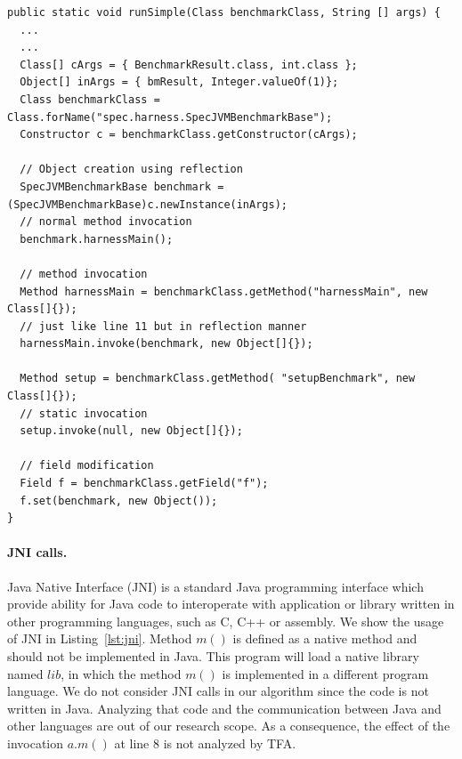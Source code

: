 \documentclass{fac}
\begin{document}
\begin{minipage}{\linewidth}
\begin{lstlisting}[caption={Example code of reflection},label={lst:reflection}]
public static void runSimple(Class benchmarkClass, String [] args) {
  ...
  ...
  Class[] cArgs = { BenchmarkResult.class, int.class };
  Object[] inArgs = { bmResult, Integer.valueOf(1)};
  Class benchmarkClass = Class.forName("spec.harness.SpecJVMBenchmarkBase");
  Constructor c = benchmarkClass.getConstructor(cArgs);

  // Object creation using reflection
  SpecJVMBenchmarkBase benchmark = (SpecJVMBenchmarkBase)c.newInstance(inArgs);
  // normal method invocation
  benchmark.harnessMain();

  // method invocation
  Method harnessMain = benchmarkClass.getMethod("harnessMain", new Class[]{});
  // just like line 11 but in reflection manner
  harnessMain.invoke(benchmark, new Object[]{});

  Method setup = benchmarkClass.getMethod( "setupBenchmark", new Class[]{});
  // static invocation
  setup.invoke(null, new Object[]{});

  // field modification
  Field f = benchmarkClass.getField("f");
  f.set(benchmark, new Object());
}
\end{lstlisting}
\end{minipage}

\paragraph{JNI calls.} Java Native Interface (JNI) is a standard Java programming interface which provide ability for Java code to interoperate with application or library written in other programming languages, such as C, C++ or assembly. We show the usage of JNI in Listing~\ref{lst:jni}. Method $m()$ is defined as a native method and should not be implemented in Java. This program will load a native library named $lib$, in which the method $m()$ is implemented in a different program language. We do not consider JNI calls in our algorithm since the code is not written in Java. Analyzing that code and the communication between Java and other languages are out of our research scope. As a consequence, the effect of the invocation $a.m()$ at line $8$ is not analyzed by TFA.
\end{document}
